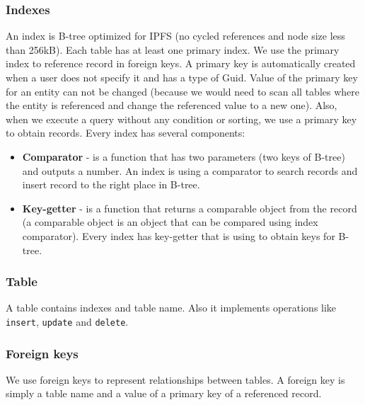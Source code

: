 \subsubsection{Indexes}
An index is B-tree optimized for IPFS (no cycled references and node size less than 256kB). Each table has at least one primary index. We use the primary index to reference record in foreign keys. A primary key is automatically created when a user does not specify it and has a type of Guid. Value of the primary key for an entity can not be changed (because we would need to scan all tables where the entity is referenced and change the referenced value to a new one). Also, when we execute a query without any condition or sorting, we use a primary key to obtain records. Every index has several components: 
\begin{itemize}
    \item \textbf{Comparator} - is a function that has two parameters (two keys of B-tree) and outputs a number. An index is using a comparator to search records and insert record to the right place in B-tree.
    \item \textbf{Key-getter} - is a function that returns a comparable object from the record (a comparable object is an object that can be compared using index comparator). Every index has key-getter that is using to obtain keys for B-tree.
\end{itemize}

\subsubsection{Table}
A table contains indexes and table name. Also it implements operations like \texttt{insert}, \texttt{update} and \texttt{delete}.

\subsubsection{Foreign keys}
We use foreign keys to represent relationships between tables. A foreign key is simply a table name and a value of a primary key of a referenced record.

